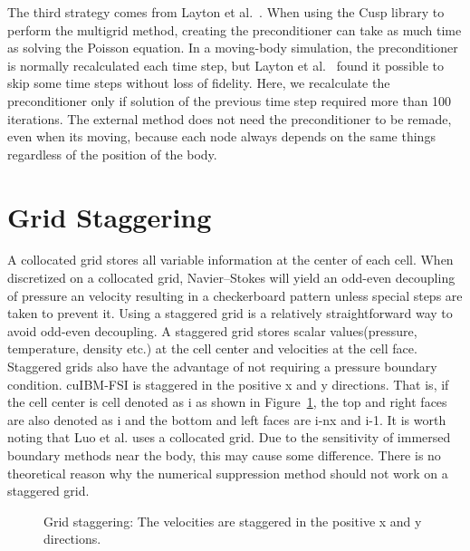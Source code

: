 The third strategy comes from Layton et al.~\cite{layton2011cuibm}.
When using the Cusp library to perform the multigrid method, creating the preconditioner can take as much time as solving the Poisson equation.
In a moving-body simulation, the preconditioner is normally recalculated each time step, but Layton et al.~\cite{layton2011cuibm} found it possible to skip some time steps without loss of fidelity.
Here, we recalculate the preconditioner only if solution of the previous time step required more than 100 iterations. 
The external method does not need the preconditioner to be remade, even when its moving, because each node always depends on the same things regardless of the position of the body. 


\section{Grid Staggering}
\label{Grid Staggering}

A collocated grid stores all variable information at the center of each cell.
When discretized on a collocated grid, Navier--Stokes will yield an odd-even decoupling of pressure an velocity resulting in a checkerboard pattern unless special steps are taken to prevent it. 
Using a staggered grid is a relatively straightforward way to avoid odd-even decoupling.
A staggered grid stores scalar values(pressure, temperature, density etc.) at the cell center and velocities at the cell face. 
Staggered grids also have the advantage of not requiring a pressure boundary condition.
cuIBM-FSI is staggered in the positive x and y directions. 
That is, if the cell center is cell denoted as i as shown in Figure~\ref{fig:stagger}, the top and right faces are also denoted as i and the bottom and left faces are i-nx and i-1. 
It is worth noting that Luo et al.\cite{Luo:2012gx} uses a collocated grid.
Due to the sensitivity of immersed boundary methods near the body, this may cause some difference.
There is no theoretical reason why the numerical suppression method should not work on a staggered grid.
\begin{figure}[!htb]
	\centering
	
	\caption{Grid staggering: The velocities are staggered in the positive x and y directions.}
	\label{fig:stagger}
\end{figure}

